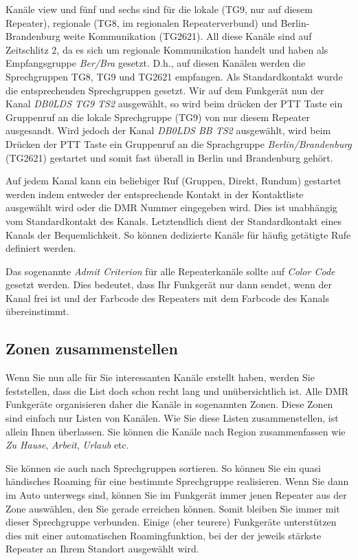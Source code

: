 Kanäle view und fünf und sechs sind für die lokale (TG9, nur auf diesem Repeater), regionale (TG8, im regionalen Repeaterverbund) und Berlin-Brandenburg weite Kommunikation (TG2621). All diese Kanäle sind auf Zeitschlitz 2, da es sich um regionale Kommunikation handelt und haben als Empfangsgruppe \emph{Ber/Bra} gesetzt. D.h., auf diesen Kanälen werden die Sprechgruppen TG8, TG9 und TG2621 empfangen. Als Standardkontakt wurde die entsprechenden Sprechgruppen gesetzt. Wir auf dem Funkgerät nun der Kanal \emph{DB0LDS TG9 TS2} ausgewählt, so wird beim drücken der PTT Taste ein Gruppenruf an die lokale Sprechgruppe (TG9) von nur diesem Repeater ausgesandt. Wird jedoch der Kanal \emph{DB0LDS BB TS2} ausgewählt, wird beim Drücken der PTT Taste ein Gruppenruf an die Sprachgruppe \emph{Berlin/Brandenburg} (TG2621) gestartet und somit fast überall in Berlin und Brandenburg gehört.

\begin{merke}
 Auf jedem Kanal kann ein beliebiger Ruf (Gruppen, Direkt, Rundum) gestartet werden indem entweder der entsprechende Kontakt in der Kontaktliste ausgewählt wird oder die DMR Nummer eingegeben wird. Dies ist unabhängig vom Standardkontakt des Kanals. Letztendlich dient der Standardkontakt eines Kanals der Bequemlichkeit. So können dedizierte Kanäle für häufig getätigte Rufe definiert werden.
\end{merke}

Das sogenannte \emph{Admit Criterion} für alle Repeaterkanäle sollte auf \emph{Color Code} gesetzt werden. Dies bedeutet, dass Ihr Funkgerät nur dann sendet, wenn der Kanal frei ist und der Farbcode des Repeaters mit dem Farbcode des Kanals übereinstimmt.

\subsection{Zonen zusammenstellen} \label{sec:zone} 
Wenn Sie nun alle für Sie interessanten Kanäle erstellt haben, werden Sie feststellen, dass die List doch schon recht lang und unübersichtlich ist. Alle DMR Funkgeräte organisieren daher die Kanäle in sogenannten Zonen. Diese Zonen sind einfach nur Listen von Kanälen. Wie Sie diese Listen zusammenstellen, ist allein Ihnen überlassen. Sie können die Kanäle nach Region zusammenfassen wie \emph{Zu Hause}, \emph{Arbeit}, \emph{Urlaub} etc. 

Sie können sie auch nach Sprechgruppen sortieren. So können Sie ein quasi händisches Roaming für eine bestimmte Sprechgruppe realisieren. Wenn Sie dann im Auto unterwegs sind, können Sie im Funkgerät immer jenen Repeater aus der Zone auswählen, den Sie gerade erreichen können. Somit bleiben Sie immer mit dieser Sprechgruppe verbunden. Einige (eher teurere) Funkgeräte unterstützen dies mit einer automatischen Roamingfunktion, bei der der jeweils stärkste Repeater an Ihrem Standort ausgewählt wird.

